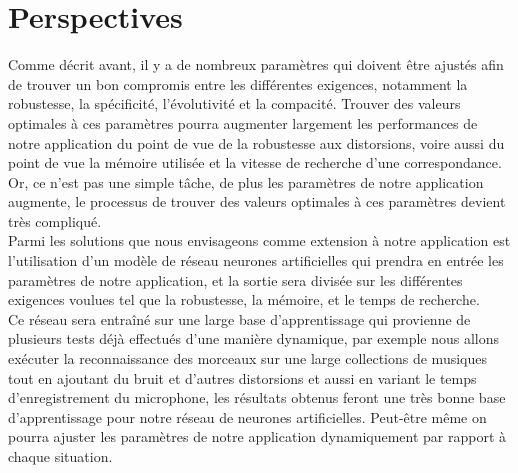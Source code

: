 \documentclass[10pt, english]{report}
\begin{document}
\chapter{Perspectives}
Comme décrit avant, il y a de nombreux paramètres qui doivent être ajustés afin de trouver un bon compromis entre les différentes exigences, notamment la robustesse, la spécificité, l'évolutivité et la compacité. Trouver des valeurs optimales à ces paramètres pourra augmenter largement les performances de notre application du point de vue de la robustesse aux distorsions, voire aussi du point de vue la mémoire utilisée et la vitesse de recherche d'une correspondance. Or, ce n'est pas une simple tâche, de plus les paramètres de notre application augmente, le processus de trouver des valeurs optimales à ces paramètres devient très compliqué.\\

Parmi les solutions que nous envisageons comme extension à notre application est l'utilisation d'un modèle de réseau neurones artificielles qui prendra en entrée les paramètres de notre application, et la sortie sera divisée sur les différentes exigences voulues tel que la robustesse, la mémoire, et le temps de recherche.\\

Ce réseau sera entraîné sur une large base d'apprentissage qui provienne de plusieurs tests déjà effectués d'une manière dynamique, par exemple nous allons exécuter la reconnaissance des morceaux sur une large collections de musiques tout en ajoutant du bruit et d'autres distorsions et aussi en variant le temps d'enregistrement du microphone, les résultats obtenus feront une très bonne base d'apprentissage pour notre réseau de neurones artificielles. Peut-être même on pourra ajuster les paramètres de notre application dynamiquement par rapport à chaque situation.\\
\end{document}

